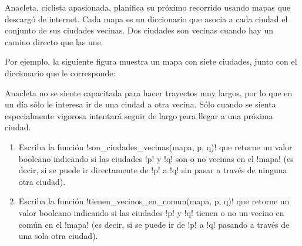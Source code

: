 Anacleta, ciclista apasionada,
planifica su próximo recorrido
usando mapas que descargó de internet.
Cada mapa es un diccionario
que asocia a cada ciudad
el conjunto de sus ciudades vecinas.
Dos ciudades son vecinas
cuando hay un camino directo que las une.

Por ejemplo,
la siguiente figura muestra un mapa con siete ciudades,
junto con el diccionario que le corresponde:

\begin{minipage}[T]{.45\textwidth}
\end{minipage}
\hfil
\begin{minipage}[T]{.45\textwidth}
  
\end{minipage}

Anacleta no se siente capacitada para hacer trayectos muy largos,
por lo que en un día sólo le interesa ir de una ciudad a otra vecina.
Sólo cuando se sienta especialmente vigorosa
intentará seguir de largo para llegar a una próxima ciudad.

\begin{enumerate}[leftmargin=0pt]
  \item
    Escriba la función \li!son_ciudades_vecinas(mapa, p, q)!
    que retorne un valor booleano
    indicando si las ciudades \li!p! y \li!q!
    son o no vecinas en el \li!mapa!
    (es decir, si se puede ir directamente de \li!p! a \li!q!
    sin pasar a través de ninguna otra ciudad).
    
  \item
    Escriba la función \li!tienen_vecinos_en_comun(mapa, p, q)!
    que retorne un valor booleano
    indicando si las ciudades \li!p! y \li!q!
    tienen o no un vecino en común en el \li!mapa!
    (es decir, si se puede ir de \li!p! a \li!q!
    pasando a través de una sola otra ciudad).
    
\end{enumerate}

